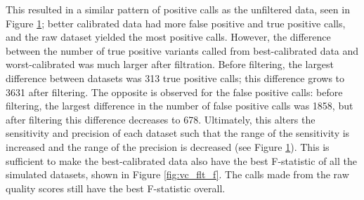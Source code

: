 This resulted in a similar pattern of positive calls as the unfiltered data, seen in Figure \ref{fig:vc_flt_p}; better calibrated data had more false positive and true positive calls, and the raw dataset yielded the most positive calls. However, the difference between the number of true positive variants called from best-calibrated data and worst-calibrated was much larger after filtration. Before filtering, the largest difference between datasets was 313 true positive calls; this difference grows to 3631 after filtering. The opposite is observed for the false positive calls: before filtering, the largest difference in the number of false positive calls was 1858, but after filtering this difference decreases to 678. 
Ultimately, this alters the sensitivity and precision of each dataset such that the range of the sensitivity is increased and the range of the precision is decreased (see Figure \ref{fig:vc_flt_p}). This is sufficient to make the best-calibrated data also have the best F-statistic of all the simulated datasets, shown in Figure \ref{fig:vc_flt_f}. The calls made from the raw quality scores still have the best F-statistic overall.

\begin{figure}
\centering
{}
\label{fig:vc_flt_p}
\end{figure}


